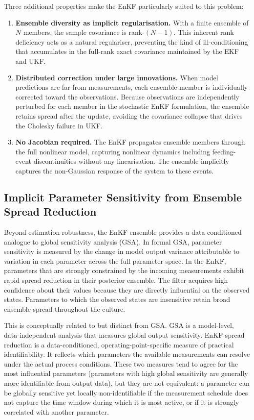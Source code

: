 {Three additional properties make the EnKF particularly suited to this problem:

\begin{enumerate}
    \item \textbf{Ensemble diversity as implicit regularisation.} With a finite ensemble of $N$ members, the sample covariance is rank-$(N-1)$. This inherent rank deficiency acts as a natural regulariser, preventing the kind of ill-conditioning that accumulates in the full-rank exact covariance maintained by the EKF and UKF.

    \item \textbf{Distributed correction under large innovations.} When model predictions are far from measurements, each ensemble member is individually corrected toward the observations. Because observations are independently perturbed for each member in the stochastic EnKF formulation, the ensemble retains spread after the update, avoiding the covariance collapse that drives the Cholesky failure in UKF.

    \item \textbf{No Jacobian required.} The EnKF propagates ensemble members through the full nonlinear model, capturing nonlinear dynamics including feeding-event discontinuities without any linearisation. The ensemble implicitly captures the non-Gaussian response of the system to these events.
\end{enumerate}

\subsection*{Implicit Parameter Sensitivity from Ensemble Spread Reduction}

Beyond estimation robustness, the EnKF ensemble provides a data-conditioned analogue to global sensitivity analysis (GSA). In formal GSA, parameter sensitivity is measured by the change in model output variance attributable to variation in each parameter across the full parameter space. In the EnKF, parameters that are strongly constrained by the incoming measurements exhibit rapid spread reduction in their posterior ensemble. The filter acquires high confidence about their values because they are directly influential on the observed states. Parameters to which the observed states are insensitive retain broad ensemble spread throughout the culture.

This is conceptually related to but distinct from GSA. GSA is a model-level, data-independent analysis that measures global output sensitivity. EnKF spread reduction is a data-conditioned, operating-point-specific measure of practical identifiability. It reflects which parameters the available measurements can resolve under the actual process conditions. These two measures tend to agree for the most influential parameters (parameters with high global sensitivity are generally more identifiable from output data), but they are not equivalent: a parameter can be globally sensitive yet locally non-identifiable if the measurement schedule does not capture the time window during which it is most active, or if it is strongly correlated with another parameter.

}

